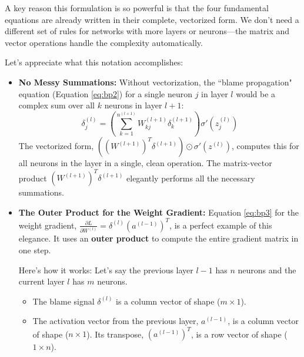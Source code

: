 \documentclass{article}
\begin{document}
A key reason this formulation is so powerful is that the four fundamental equations are already written in their complete, vectorized form. We don't need a different set of rules for networks with more layers or neurons—the matrix and vector operations handle the complexity automatically.

Let's appreciate what this notation accomplishes:
\begin{itemize}
    \item \textbf{No Messy Summations:} Without vectorization, the ``blame propagation" equation (Equation \ref{eq:bp2}) for a single neuron $j$ in layer $l$ would be a complex sum over all $k$ neurons in layer $l+1$:
    $$ \delta_j^{(l)} = \left( \sum_{k=1}^{n^{(l+1)}} W_{kj}^{(l+1)} \delta_k^{(l+1)} \right) \sigma'(z_j^{(l)}) $$
    The vectorized form, $\left( (W^{(l+1)})^T \delta^{(l+1)} \right) \odot \sigma'(z^{(l)})$, computes this for all neurons in the layer in a single, clean operation. The matrix-vector product $(W^{(l+1)})^T \delta^{(l+1)}$ elegantly performs all the necessary summations.

    \item \textbf{The Outer Product for the Weight Gradient:} Equation \ref{eq:bp3} for the weight gradient, $\frac{\partial L}{\partial W^{(l)}} = \delta^{(l)} (a^{(l-1)})^T$, is a perfect example of this elegance. It uses an \textbf{outer product} to compute the entire gradient matrix in one step.
    
    Here's how it works: Let's say the previous layer $l-1$ has $n$ neurons and the current layer $l$ has $m$ neurons.
    \begin{itemize}
        \item The blame signal $\delta^{(l)}$ is a column vector of shape ($m \times 1$).
        \item The activation vector from the previous layer, $a^{(l-1)}$, is a column vector of shape ($n \times 1$). Its transpose, $(a^{(l-1)})^T$, is a row vector of shape ($1 \times n$).
    \end{itemize}
    

\end{itemize}
\end{document}
